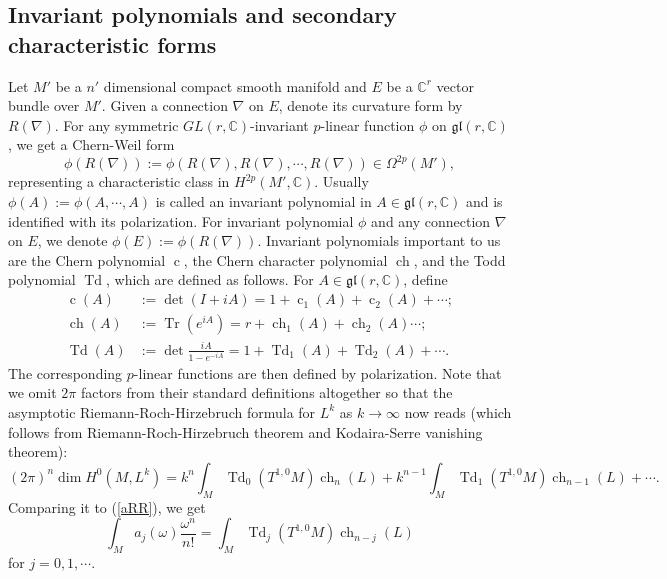 \documentclass[12pt,reqno,a4paper]{amsart}
\numberwithin{equation}{section}
\DeclareMathOperator{\Td}{Td}
\DeclareMathOperator{\ch}{ch}
\DeclareMathOperator{\cc}{c}
\DeclareMathOperator{\Tr}{Tr}
\theoremstyle{remark}
\theoremstyle{dotless}
\begin{document}
\subsection{Invariant polynomials and secondary characteristic forms}\label{subsecBC}
Let $M'$ be a $n'$ dimensional compact smooth manifold and $E$ be a $\mathbb{C}^r$ vector bundle over $M'$. Given a connection $\nabla$ on $E$, denote its curvature form by $R(\nabla)$. For any symmetric $GL(r,\mathbb{C})$-invariant $p$-linear function $\phi$ on $\mathfrak{gl}(r,\mathbb{C})$, we get a Chern-Weil form
\begin{equation*}
\phi(R(\nabla)):=\phi(R(\nabla),R(\nabla),\cdots,R(\nabla))\in \Omega^{2p}(M'),
\end{equation*}
representing a characteristic class in $H^{2p}(M',\mathbb{C})$. Usually $\phi(A):=\phi(A,\cdots,A)$ is called an invariant polynomial in $A\in\mathfrak{gl}(r,\mathbb{C})$ and is identified with its polarization. For invariant polynomial $\phi$ and any connection $\nabla$ on $E$, we denote $\phi(E):=\phi(R(\nabla))$. Invariant polynomials important to us are the Chern polynomial $\cc$, the Chern character polynomial $\ch$, and the Todd polynomial $\Td$, which are defined as follows. For $A\in\mathfrak{gl}(r,\mathbb{C})$, define
\begin{align*}
\cc(A)&:=\det (I+iA)=1+\cc_1(A)+\cc_2(A)+\cdots;\\
\ch(A)&:=\Tr (e^{iA}) = r+\ch_1(A)+\ch_2(A)\cdots;\\
\Td(A)&:=\det\frac{iA}{1-e^{-iA}}=1+\Td_1(A)+\Td_2(A)+\cdots.
\end{align*}
The corresponding $p$-linear functions are then defined by polarization. Note that we omit $2\pi$ factors from their standard definitions altogether so that the asymptotic Riemann-Roch-Hirzebruch formula for $L^k$ as $k\rightarrow\infty$ now reads (which follows from Riemann-Roch-Hirzebruch theorem and Kodaira-Serre vanishing theorem):
\begin{equation}\label{aRR2}
(2\pi)^n\dim H^0(M,L^k)=k^n\int_M \Td_0(T^{1,0}M)\ch_n(L)+k^{n-1}\int_M \Td_1(T^{1,0}M)\ch_{n-1}(L)+\cdots.
\end{equation}
Comparing it to (\ref{aRR}), we get 
\begin{equation*}
\int_M a_j(\omega)\frac{\omega^n}{n!}=\int_M \Td_j(T^{1,0}M)\ch_{n-j}(L)
\end{equation*}
for $j=0,1,\cdots$.
\end{document}
